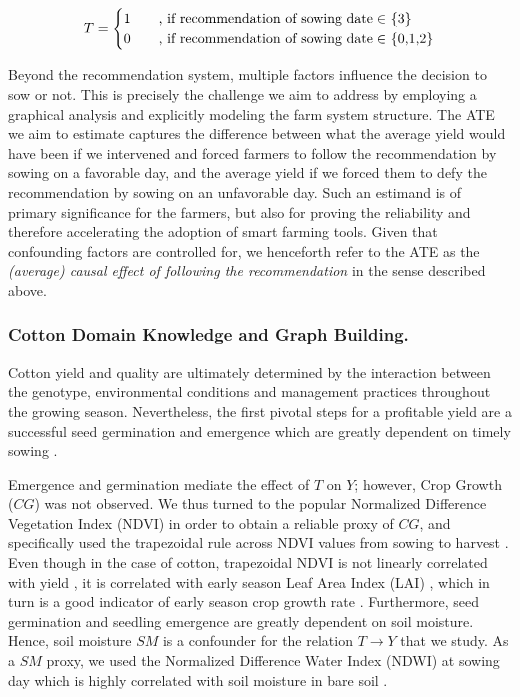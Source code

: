 \documentclass[letterpaper]{article} %
\begin{document}
\[
T =
\begin{cases}
1 &\quad\text{, if recommendation of sowing date} \in $ \{3\}$\\
0 &\quad\text{, if recommendation of sowing date} \in $ \{0,1,2\}$
\end{cases}
\]

Beyond the recommendation system, multiple factors influence the decision to sow or not. This is precisely the challenge we aim to address by employing a graphical analysis and explicitly modeling the farm system structure. The ATE we aim to estimate captures the difference between what the average yield would have been if we intervened and forced farmers to follow the recommendation by sowing on a favorable day, and the average yield if we forced them to defy the recommendation by sowing on an unfavorable day. Such an estimand is of primary significance for the farmers, but also for proving the reliability and therefore accelerating the adoption of smart farming tools.
Given that
confounding factors are controlled for, we henceforth refer to the ATE as the \textit{(average) causal effect of following the recommendation} in the sense described above.

\subsubsection{Cotton Domain Knowledge and Graph Building.}

Cotton yield and quality are ultimately determined by the interaction between the genotype, environmental conditions and management practices throughout the growing season. Nevertheless, the first pivotal steps for a profitable yield are a successful seed germination and emergence which are greatly dependent on timely sowing \cite{wanjura1969emergence, bauer1998planting,  bradow2010germination}.

Emergence and germination mediate the effect of $T$ on $Y$; however, Crop Growth ($CG$) was not observed. We thus turned to the popular Normalized Difference Vegetation Index (NDVI) in order to obtain a reliable proxy of $CG$, and specifically used the trapezoidal rule across NDVI values from sowing to harvest %
\cite{eklundh2015timesat}. Even though in the case of cotton, trapezoidal NDVI is not linearly correlated with yield \cite{dalezios2001cotton, zhao2007canopy}, it is correlated with early season Leaf Area Index (LAI) \cite{zhao2007canopy}, which in turn is a good indicator of early season crop growth rate \cite{virk2019physiological}.
Furthermore, seed germination and seedling emergence are greatly dependent on soil moisture. Hence, soil moisture $SM$ is a confounder for the relation $T \rightarrow Y$ that we study. As a $SM$ proxy, we used the Normalized Difference Water Index (NDWI) at sowing day which is highly correlated with soil moisture in bare soil \cite{casamitjana2020soil}.
\end{document}
